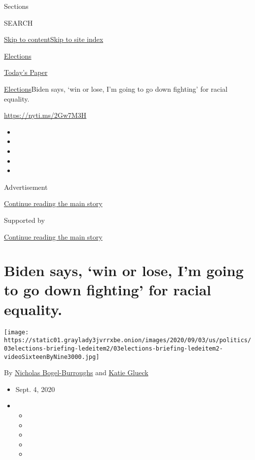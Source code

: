 Sections

SEARCH

\protect\hyperlink{site-content}{Skip to
content}\protect\hyperlink{site-index}{Skip to site index}

\href{https://www.nytimes3xbfgragh.onion/news-event/2020-election}{Elections}

\href{https://myaccount.nytimes3xbfgragh.onion/auth/login?response_type=cookie\&client_id=vi}{}

\href{https://www.nytimes3xbfgragh.onion/section/todayspaper}{Today's
Paper}

\href{/news-event/2020-election}{Elections}\textbar{}Biden says, `win or
lose, I'm going to go down fighting' for racial equality.

\url{https://nyti.ms/2Gw7M3H}

\begin{itemize}
\item
\item
\item
\item
\item
\end{itemize}

Advertisement

\protect\hyperlink{after-top}{Continue reading the main story}

Supported by

\protect\hyperlink{after-sponsor}{Continue reading the main story}

\hypertarget{biden-says-win-or-lose-im-going-to-go-down-fighting-for-racial-equality}{%
\section{Biden says, `win or lose, I'm going to go down fighting' for
racial
equality.}\label{biden-says-win-or-lose-im-going-to-go-down-fighting-for-racial-equality}}

\texttt{[image: https://static01.graylady3jvrrxbe.onion/images/2020/09/03/us/politics/03elections-briefing-ledeitem2/03elections-briefing-ledeitem2-videoSixteenByNine3000.jpg]}

By
\href{https://www.nytimes3xbfgragh.onion/by/nicholas-bogel-burroughs}{Nicholas
Bogel-Burroughs} and
\href{https://www.nytimes3xbfgragh.onion/by/katie-glueck}{Katie Glueck}

\begin{itemize}
\item
  Sept. 4, 2020
\item
  \begin{itemize}
  \item
  \item
  \item
  \item
  \item
  \end{itemize}
\end{itemize}

